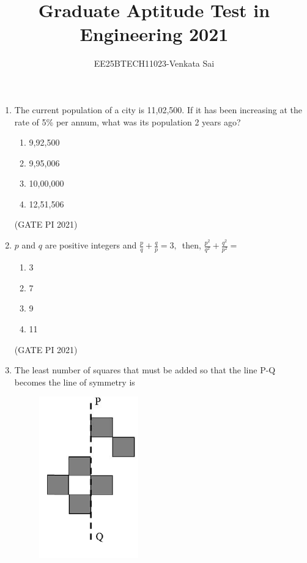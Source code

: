 \documentclass[journal,12pt,onecolumn]{IEEEtran}
\title{Graduate Aptitude Test in Engineering 2021}
\author{EE25BTECH11023-Venkata Sai}
\theoremstyle{remark}
\begin{document}
\maketitle
\begin{enumerate}
\item The current population of a city is 11,02,500. If it has been increasing at the rate of 5\% per annum, what was its population 2 years ago?

\begin{multicols}{4}
\begin{enumerate}
\item 9,92,500
\item 9,95,006
\item 10,00,000
\item 12,51,506
\end{enumerate}
\end{multicols}
\hfill (GATE PI 2021)

\item $p$ and $q$ are positive integers and $\frac{p}{q} + \frac{q}{p} = 3,$\
then, $\frac{p^2}{q^2} + \frac{q^2}{p^2} =$

\begin{multicols}{4}
\begin{enumerate}
\item 3
\item 7
\item 9
\item 11
\end{enumerate}
\end{multicols}
\hfill (GATE PI 2021)

\item
The least number of squares that must be added so that the line P-Q becomes the line of symmetry is 

\begin{figure}[H]
    \centering
    \includegraphics[width=0.3\columnwidth]{figs/fig1.png}
    \caption{}
    \label{fig:placeholder}
\end{figure} 


\end{enumerate}
\end{document}
